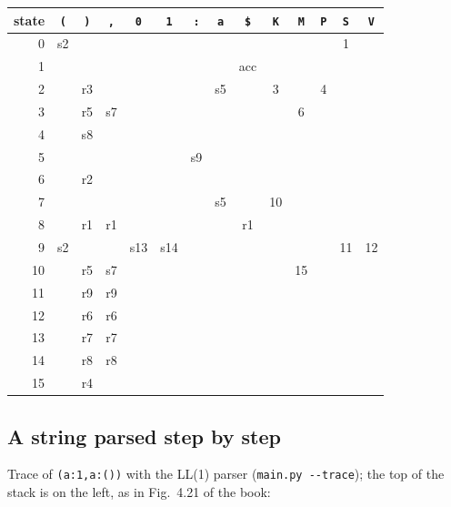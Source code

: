\documentclass[11pt]{article}
\begin{document}
\begin{center}\small
\begin{tabular}{r|cccccccc|ccccc}
\toprule
state & \texttt{(} & \texttt{)} & \texttt{,{}} & \texttt{0} & \texttt{1} & \texttt{:} & \texttt{a} & \texttt{\$} & \texttt{K} & \texttt{M} & \texttt{P} & \texttt{S} & \texttt{V} \\
\midrule
0 & s2 &  &  &  &  &  &  &  &  &  &  & 1 &  \\
1 &  &  &  &  &  &  &  & acc &  &  &  &  &  \\
2 &  & r3 &  &  &  &  & s5 &  & 3 &  & 4 &  &  \\
3 &  & r5 & s7 &  &  &  &  &  &  & 6 &  &  &  \\
4 &  & s8 &  &  &  &  &  &  &  &  &  &  &  \\
5 &  &  &  &  &  & s9 &  &  &  &  &  &  &  \\
6 &  & r2 &  &  &  &  &  &  &  &  &  &  &  \\
7 &  &  &  &  &  &  & s5 &  & 10 &  &  &  &  \\
8 &  & r1 & r1 &  &  &  &  & r1 &  &  &  &  &  \\
9 & s2 &  &  & s13 & s14 &  &  &  &  &  &  & 11 & 12 \\
10 &  & r5 & s7 &  &  &  &  &  &  & 15 &  &  &  \\
11 &  & r9 & r9 &  &  &  &  &  &  &  &  &  &  \\
12 &  & r6 & r6 &  &  &  &  &  &  &  &  &  &  \\
13 &  & r7 & r7 &  &  &  &  &  &  &  &  &  &  \\
14 &  & r8 & r8 &  &  &  &  &  &  &  &  &  &  \\
15 &  & r4 &  &  &  &  &  &  &  &  &  &  &  \\
\bottomrule
\end{tabular}
\end{center}

\subsection{A string parsed step by step}

Trace of \texttt{(a:1,{}a:())} with the LL(1) parser (\texttt{main.py -{}-trace});
the top of the stack is on the left, as in Fig.~4.21 of the book:
\end{document}
